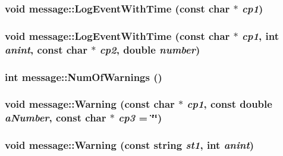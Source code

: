 \label{classmessage_a5e553d7905bef50a91b8318445139033}
\hypertarget{classmessage_a9292720e75bec37fc568dfffbb02a68f}{
\subsubsection[{LogEventWithTime}]{\setlength{\rightskip}{0pt plus 5cm}void message::LogEventWithTime (const char $\ast$ {\em cp1})}}
\label{classmessage_a9292720e75bec37fc568dfffbb02a68f}
\hypertarget{classmessage_adbb11c1e5f2d24e132ed20812e67fadb}{
\subsubsection[{LogEventWithTime}]{\setlength{\rightskip}{0pt plus 5cm}void message::LogEventWithTime (const char $\ast$ {\em cp1}, \/  int {\em anint}, \/  const char $\ast$ {\em cp2}, \/  double {\em number})}}
\label{classmessage_adbb11c1e5f2d24e132ed20812e67fadb}
\hypertarget{classmessage_ad3c7bd4317ab5c92d1d9d822540ff72a}{
\subsubsection[{NumOfWarnings}]{\setlength{\rightskip}{0pt plus 5cm}int message::NumOfWarnings ()}}
\label{classmessage_ad3c7bd4317ab5c92d1d9d822540ff72a}
\hypertarget{classmessage_aa10e99e4b4f6aef0c00f0c5021142042}{
\subsubsection[{Warning}]{\setlength{\rightskip}{0pt plus 5cm}void message::Warning (const char $\ast$ {\em cp1}, \/  const double {\em aNumber}, \/  const char $\ast$ {\em cp3} = {\ttfamily \char`\"{}\char`\"{}})}}
\label{classmessage_aa10e99e4b4f6aef0c00f0c5021142042}
\hypertarget{classmessage_a0ba3b49320345b5056b1321fe4f6f65e}{
\subsubsection[{Warning}]{\setlength{\rightskip}{0pt plus 5cm}void message::Warning (const string {\em st1}, \/  int {\em anint})}}
